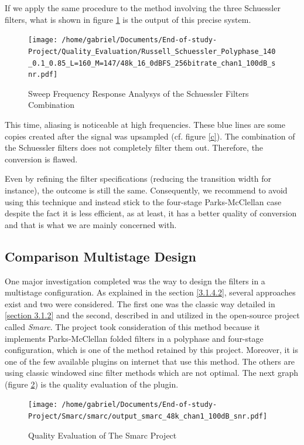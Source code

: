 If we apply the same procedure to the method involving the three Schuessler filters, what is shown in figure \ref{Figure 3.25} is the output of this precise system.

\begin{figure}[ht!]
	\centering
	\texttt{[image: /home/gabriel/Documents/End-of-study-Project/Quality\_Evaluation/Russell\_Schuessler\_Polyphase\_140\_0.1\_0.85\_L=160\_M=147/48k\_16\_0dBFS\_256bitrate\_chan1\_100dB\_snr.pdf]}
	\captionsetup{width=0.98\linewidth}
	\caption{Sweep Frequency Response Analysys of the Schuessler Filters Combination}\label{Figure 3.25}
\end{figure}

This time, aliasing is noticeable at high frequencies. These blue lines are some copies created after the signal was upsampled (cf. figure \ref{c}). The combination of the Schuessler filters does not completely filter them out. Therefore, the conversion is flawed. 

Even by refining the filter specifications (reducing the transition width for instance), the outcome is still the same. Consequently, we recommend to avoid using this technique and instead stick to the four-stage Parks-McClellan case despite the fact it is less efficient, as at least, it has a better quality of conversion and that is what we are mainly concerned with. 



\subsection{Comparison Multistage Design}\label{section 3.2.6}

One major investigation completed was the way to design the filters in a multistage configuration. As explained in the section \ref{3.1.4.2}, several approaches exist and two were considered. The first one was the classic way detailed in \ref{section 3.1.2} and the second, described in \cite{paristech} and utilized in the open-source project called \textit{Smarc}. The project took consideration of this method because it implements Parks-McClellan folded filters in a polyphase and four-stage configuration, which is one of the method retained by this project. Moreover, it is one of the few available plugins on internet that use this method. The others are using classic windowed sinc filter methods which are not optimal. The next graph (figure \ref{Figure 3.26}) is the quality evaluation of the plugin. 


\begin{figure}[ht!]
	\centering
	\texttt{[image: /home/gabriel/Documents/End-of-study-Project/Smarc/smarc/output\_smarc\_48k\_chan1\_100dB\_snr.pdf]}
	\caption{Quality Evaluation of The Smarc Project}\label{Figure 3.26}
\end{figure}

